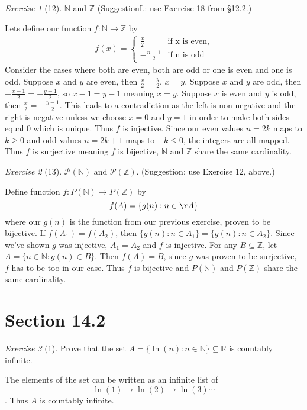 \documentclass[12pt]{amsart}
\makeatletter
\theoremstyle{remark}
\newtheorem*{exercise}{Exercise}%
\def\RR{\ensuremath{\mathbb R}}
\def\NN{\ensuremath{\mathbb N}}
\def\ZZ{\ensuremath{\mathbb Z}}
\newcommand{\mc}[1]{\ensuremath{\mathcal{#1}}} %
\renewenvironment{proof}[1][\proofname]{\par\doublespacing
  \pushQED{\qed}%
  \normalfont \topsep6\p@\@plus6\p@\relax
  \list{}{%
    \settowidth{\leftmargin}{\itshape\proofname:\hskip\labelsep}%
    \setlength{\labelwidth}{0pt}%
    \setlength{\itemindent}{-\leftmargin}%
  }%
  \item[\hskip\labelsep\itshape#1\@addpunct{:}]\ignorespaces
}{%
  \popQED\endlist\@endpefalse
  \singlespacing
}
\theoremstyle{mycomment}
\makeatother
\begin{document}
\begin{exercise}[12] $\NN$ and $\ZZ$ (SuggestionL: use Exercise 18 from \S12.2.)
\begin{proof}[Solution]
Lets define our function $f : \NN \rightarrow \ZZ$ by 
\begin{align*}
  f(x) = \begin{cases} \frac{x}{2} & \text{if x is even,} \\ -\frac{n-1}{2} & \text{if n is odd}  \end{cases}
\end{align*}
Consider the cases where both are even, both are odd or one is even and one is odd. Suppose $x$ and $y$ are even, then $\frac{x}{2} = \frac{y}{2}$. $x = y$.
Suppose $x$ and $y$ are odd, then $-\frac{x - 1}{2} = -\frac{y - 1}{2}$, so $x - 1 = y - 1$ meaning $x = y$. Suppose $x$ is even and $y$ is odd, then $\frac{x}{2} = -\frac{y - 1}{2}$. This leads to a contradiction as the left is non-negative and the right is negative unless we choose $x = 0$ and $y = 1$ in order to make both sides equal $0$ which is unique. Thus $f$ is injective. Since our even values $n = 2k$ maps to $k \geq 0$ and odd values $n = 2k + 1$ maps to $-k \leq 0$, the integers are all mapped. Thus $f$ is surjective meaning $f$ is bijective, $\NN$ and $\ZZ$ share the same cardinality.
\end{proof}
\end{exercise}

\begin{exercise}[13] $\mc P(\NN)$ and $\mc P(\ZZ)$. (Suggestion: use Exercise 12, above.)
\begin{proof}
  Define function $f: P(\NN) \rightarrow P(\ZZ)$ by $$f(A) = \{g(n): n \in \AA\}$$ where our $g(n)$ is the function from our previous exercise, proven to be bijective. If $f(A_1) = f(A_2)$, then $\{g(n):n \in A_1\} = \{g(n):n \in A_2\}$. Since we've shown $g$ was injective, $A_1 = A_2$ and $f$ is injective. For any $B \subseteq \ZZ$, let $ A = \{n \in \NN:g(n) \in B\}$. Then $f(A) = B$, since $g$ was proven to be surjective, $f$ has to be too in our case. Thus $f$ is bijective and $P(\NN)$ and $P(\ZZ)$ share the same cardinality.
\end{proof}
\end{exercise}

\section*{Section 14.2}
\begin{exercise}[1] Prove that the set $A=\{\ln(n):n\in \NN\}\subseteq \RR$ is countably infinite.
\begin{proof}
The elements of the set can be written as an infinite list of $$\ln(1)\rightarrow\ln(2)\rightarrow\ln(3)\cdots$$. Thus $A$ is countably infinite.
\end{proof}
\end{exercise}
\end{document}
